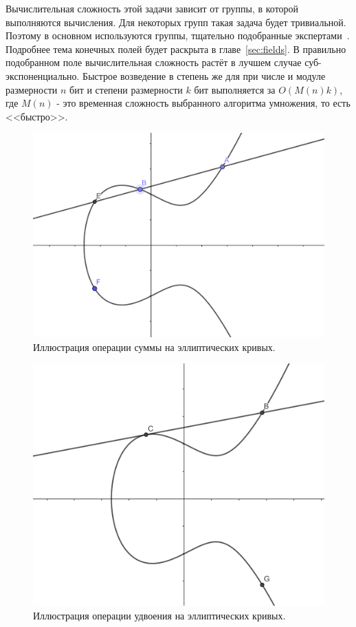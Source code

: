 \documentclass[times,specification,annotation]{itmo-student-thesis}
\begin{document}
Вычислительная сложность этой задачи зависит от группы, в которой выполняются вычисления.
Для некоторых групп такая задача будет тривиальной.
Поэтому в основном используются группы, тщательно подобранные экспертами~\cite{rfc2412}.
Подробнее тема конечных полей будет раскрыта в главе~\ref{sec:fields}.
В правильно подобранном поле вычислительная сложность растёт в лучшем случае суб-экспоненциально.
Быстрое возведение в степень же для при числе и модуле размерности $n$ бит и степени размерности $k$ бит
выполняется за $O(M(n)k)$, где $M(n)$ - это временная сложность выбранного алгоритма умножения, то есть <<быстро>>.

\begin{figure}[!h]
\caption{Иллюстрация операции суммы на эллиптических кривых.}\label{fig:ec_sum}
\includegraphics[width=15cm]{graphics/ec_summation.png}
\end{figure}
\begin{figure}[!h]
\caption{Иллюстрация операции удвоения на эллиптических кривых.}\label{fig:ec_doub}
\includegraphics[width=15cm]{graphics/ec_doubling.png}
\end{figure}
\end{document}
